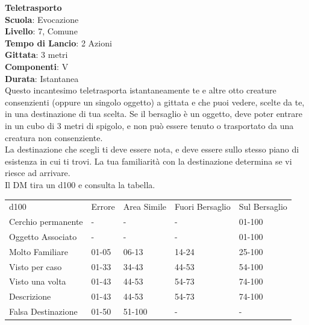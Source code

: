 \begin{multicols}{2}
\medskip\textbf{Teletrasporto}\\
\textbf{Scuola}: Evocazione\\
\textbf{Livello}: 7, Comune\\
\textbf{Tempo di Lancio}: 2 Azioni\\
\textbf{Gittata}: 3 metri\\
\textbf{Componenti}: V\\
\textbf{Durata}: Istantanea\\
Questo incantesimo teletrasporta istantaneamente te e altre otto creature consenzienti (oppure un singolo oggetto) a gittata e che puoi vedere, scelte da te, in una destinazione di tua scelta. Se il bersaglio è un oggetto, deve poter entrare in un cubo di 3 metri di spigolo, e non può essere tenuto o trasportato da una creatura non consenziente.\\
La destinazione che scegli ti deve essere nota, e deve essere sullo stesso piano di esistenza in cui ti trovi. La tua familiarità con la destinazione determina se vi riesce ad arrivare.\\
Il DM tira un d100 e consulta la tabella.
\end{multicols}
\medskip
\begin{tabular}{lllll}
\toprule
d100 &Errore&Area Simile&Fuori Bersaglio&Sul Bersaglio\\
Cerchio permanente&-&-&-&01-100\\
Oggetto Associato&-&-&-&01-100\\
Molto Familiare&01-05&06-13&14-24&25-100\\
Visto per caso&01-33&34-43&44-53&54-100\\
Visto una volta&01-43&44-53&54-73&74-100\\
Descrizione&01-43&44-53&54-73&74-100\\
Falsa Destinazione&01-50&51-100&-&-\\
\end{tabular}
\medskip
